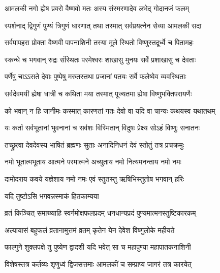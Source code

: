 \twolineshloka
{आमलकी नगो ह्येष प्रवरो वैष्णवो मतः}
{अस्य संस्मरणादेव लभेद् गोदानजं फलम्}%

\twolineshloka
{स्पर्शनाद् द्विगुणं पुण्यं त्रिगुणं धारणात् तथा}
{तस्मात् सर्वप्रयत्नेन सेव्या आमलकी सदा}%

\twolineshloka
{सर्वपापहरा प्रोक्ता वैष्णवी पापनाशिनी}
{तस्या मूले स्थितो विष्णुस्तदूर्ध्वे च पितामहः}%

\twolineshloka
{स्कन्धे च भगवान् रुद्रः संस्थितः परमेश्वरः}
{शाखासु मुनयः सर्वे प्रशाखासु च देवताः}%

\twolineshloka
{पर्णेषु चाऽऽसते देवाः पुष्पेषु मरुतस्तथा}
{प्रजानां पतयः सर्वे फलेष्वेव व्यवस्थिताः}%

\twolineshloka
{सर्वदेवमयी ह्येषा धात्री च कथिता मया}
{तस्मात् पूज्यतमा ह्येषा विष्णुभक्तिपरायणैः}%


\twolineshloka
{को भवान् न हि जानीमः कस्मात् कारणतां गतः}
{देवो वा यदि वा चान्यः कथयस्व यथातथम्}%


\twolineshloka
{यः कर्ता सर्वभूतानां भुवनानां च सर्वशः}
{विस्मितान् विदुषः प्रेक्ष्य सोऽहं विष्णुः सनातनः}%

\twolineshloka
{तच्छ्रुत्वा देवदेवस्य भाषितं ब्रह्मणः सुताः}
{अनादिनिधनं देवं स्तोतुं तत्र प्रचक्रमुः}%

\twolineshloka
{नमो भूतात्मभूताय आत्मने परमात्मने}
{अच्युताय नमो नित्यमनन्ताय नमो नमः}%

\twolineshloka
{दामोदराय कवये यज्ञेशाय नमो नमः}
{एवं स्तुतस्तु ऋषिभिस्तुतोष भगवान् हरिः}%



\onelineshloka
{यदि तुष्टोऽसि भगवन्नस्माकं हितकाम्यया}%

\twolineshloka
{व्रतं किञ्चित् समाख्याहि स्वर्गमोक्षफलप्रदम्}
{धनधान्यप्रदं पुण्यमात्मनस्तुष्टिकारकम्}%

\twolineshloka
{अल्पायासं बहुफलं व्रतानामुत्तमं व्रतम्}
{कृतेन येन देवेश विष्णुलोके महीयते}%


\twolineshloka
{फाल्गुने शुक्लपक्षे तु पुष्येण द्वादशी यदि}
{भवेत् सा च महापुण्या महापातकनाशिनी}%

\twolineshloka
{विशेषस्तत्र कर्तव्यः शृणुध्वं द्विजसत्तमाः}
{आमलकीं च सम्प्राप्य जागरं तत्र कारयेत्}%

